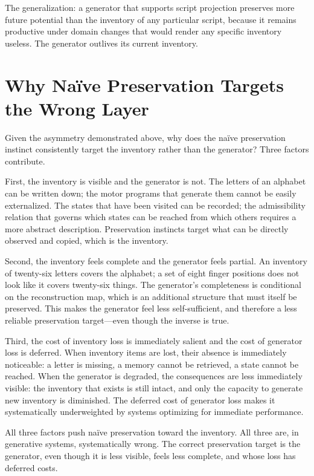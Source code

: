 \documentclass[12pt, oneside]{book}
\theoremstyle{flyxion}
\theoremstyle{definition}
\begin{document}
The generalization: a generator that supports script projection
preserves more future potential than the inventory of any
particular script, because it remains productive under
domain changes that would render any specific inventory
useless. The generator outlives its current inventory.

\section{Why Naïve Preservation Targets the Wrong Layer}

Given the asymmetry demonstrated above, why does the
naïve preservation instinct consistently target the
inventory rather than the generator? Three factors
contribute.

First, the inventory is visible and the generator is not.
The letters of an alphabet can be written down; the motor
programs that generate them cannot be easily externalized.
The states that have been visited can be recorded; the
admissibility relation that governs which states can be
reached from which others requires a more abstract description.
Preservation instincts target what can be directly observed
and copied, which is the inventory.

Second, the inventory feels complete and the generator feels
partial. An inventory of twenty-six letters covers the
alphabet; a set of eight finger positions does not look like
it covers twenty-six things. The generator's completeness
is conditional on the reconstruction map, which is an
additional structure that must itself be preserved. This
makes the generator feel less self-sufficient, and
therefore a less reliable preservation target---even though
the inverse is true.

Third, the cost of inventory loss is immediately salient
and the cost of generator loss is deferred. When inventory
items are lost, their absence is immediately noticeable:
a letter is missing, a memory cannot be retrieved, a state
cannot be reached. When the generator is degraded, the
consequences are less immediately visible: the inventory
that exists is still intact, and only the capacity to
generate new inventory is diminished. The deferred cost
of generator loss makes it systematically underweighted
by systems optimizing for immediate performance.

All three factors push naïve preservation toward the
inventory. All three are, in generative systems, systematically
wrong. The correct preservation target is the generator,
even though it is less visible, feels less complete, and
whose loss has deferred costs.
\end{document}
